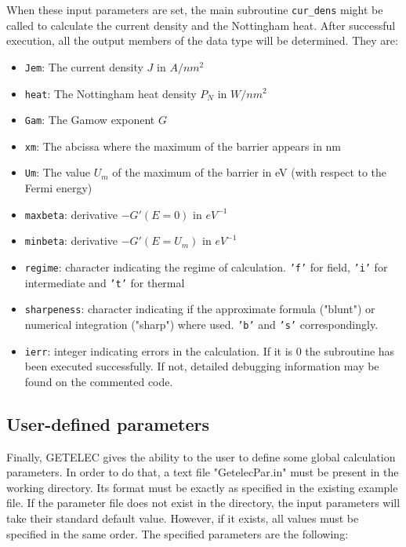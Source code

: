 \documentclass[notitlepage]{revtex4-1}
\begin{document}
When these input parameters are set, the main subroutine \texttt{cur\_dens} might be called to calculate the current density and the Nottingham heat. After successful execution, all the output members of the data type will be determined. They are:
\begin{itemize}
	\item \texttt{Jem}: The current density $J$ in $A/nm^2$
	\item \texttt{heat}: The Nottingham heat density $P_N$ in $W/nm^2$
	\item \texttt{Gam}: The Gamow exponent $G$
	\item \texttt{xm}: The abcissa where the maximum of the barrier appears in nm
	\item \texttt{Um}: The value $U_m$ of the maximum of the barrier in eV (with respect to the Fermi energy)
	\item \texttt{maxbeta}: derivative $-G'( E = 0)$ in $eV^{-1}$
	\item \texttt{minbeta}: derivative $-G'( E = U_m)$ in $eV^{-1}$
	\item \texttt{regime}: character indicating the regime of calculation. \texttt{'f'} for field, \texttt{'i'} for intermediate and \texttt{'t'} for thermal
	\item \texttt{sharpeness}: character indicating if the approximate formula ("blunt") or numerical integration ("sharp") where used. \texttt{'b'} and \texttt{'s'} correspondingly.
	\item \texttt{ierr}: integer indicating errors in the calculation. If it is 0 the subroutine has been executed successfully. If not, detailed debugging information may be found on the commented code.    
\end{itemize}

\subsection{User-defined parameters}

Finally, GETELEC gives the ability to the user to define some global calculation parameters. In order to do that, a text file "GetelecPar.in" must be present in the working directory. Its format must be exactly as specified in the existing example file. If the parameter file does not exist in the directory, the input parameters will take their standard default value. However, if it exists, all values must be specified in the same order. The specified parameters are the following: 
\end{document}
